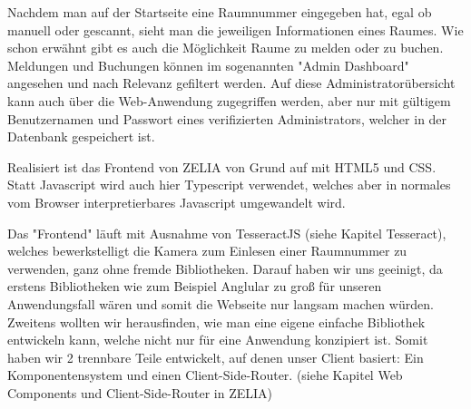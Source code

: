 Nachdem man auf der Startseite eine Raumnummer eingegeben hat, egal ob manuell oder gescannt, sieht man die jeweiligen Informationen eines Raumes. Wie schon erwähnt gibt es auch die Möglichkeit Raume zu melden oder zu buchen. Meldungen und Buchungen können im sogenannten "Admin Dashboard" angesehen und nach Relevanz gefiltert werden. Auf diese Administratorübersicht kann auch über die Web-Anwendung zugegriffen werden, aber nur mit gültigem Benutzernamen und Passwort eines verifizierten Administrators, welcher in der Datenbank gespeichert ist.

Realisiert ist das Frontend von ZELIA von Grund auf mit HTML5 und CSS. Statt Javascript wird auch hier Typescript verwendet, welches aber in normales vom Browser interpretierbares Javascript umgewandelt wird. 

Das "Frontend" läuft mit Ausnahme von TesseractJS (siehe Kapitel Tesseract), welches bewerkstelligt die Kamera zum Einlesen einer Raumnummer zu verwenden, ganz ohne fremde Bibliotheken. Darauf haben wir uns geeinigt, da erstens Bibliotheken wie zum Beispiel Anglular zu groß für unseren Anwendungsfall wären und somit die Webseite nur langsam machen würden. Zweitens wollten wir herausfinden, wie man eine eigene einfache Bibliothek entwickeln kann, welche nicht nur für eine Anwendung konzipiert ist. Somit haben wir 2 trennbare Teile entwickelt, auf denen unser Client basiert: Ein Komponentensystem und einen Client-Side-Router. (siehe Kapitel Web Components und Client-Side-Router in ZELIA)